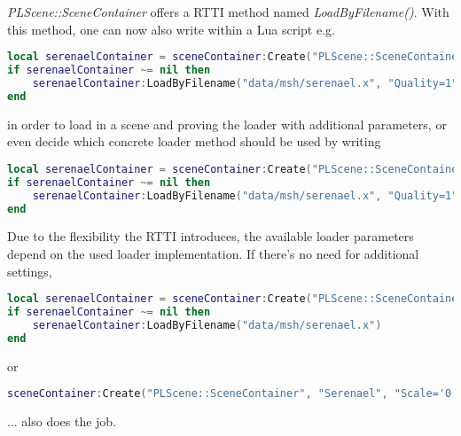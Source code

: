 \emph{PLScene::SceneContainer} offers a RTTI method named \emph{LoadByFilename()}. With this method, one can now also write within a Lua script e.g.
\begin{lstlisting}[language=lua]
local serenaelContainer = sceneContainer:Create("PLScene::SceneContainer", "Serenael", "Scale='0.05 0.05 0.05'")
if serenaelContainer ~= nil then
	serenaelContainer:LoadByFilename("data/msh/serenael.x", "Quality=1")
end
\end{lstlisting}
in order to load in a scene and proving the loader with additional parameters, or even decide which concrete loader method should be used by writing
\begin{lstlisting}[language=lua]
local serenaelContainer = sceneContainer:Create("PLScene::SceneContainer", "Serenael", "Scale='0.05 0.05 0.05'")
if serenaelContainer ~= nil then
	serenaelContainer:LoadByFilename("data/msh/serenael.x", "Quality=1", "LoadParams")
end
\end{lstlisting}
Due to the flexibility the \ac{RTTI} introduces, the available loader parameters depend on the used loader implementation. If there's no need for additional settings,
\begin{lstlisting}[language=lua]
local serenaelContainer = sceneContainer:Create("PLScene::SceneContainer", "Serenael", "Scale='0.05 0.05 0.05'")
if serenaelContainer ~= nil then
	serenaelContainer:LoadByFilename("data/msh/serenael.x")
end
\end{lstlisting}
or
\begin{lstlisting}[language=lua]
sceneContainer:Create("PLScene::SceneContainer", "Serenael", "Scale='0.05 0.05 0.05' Filename='data/msh/serenael.x'")
\end{lstlisting}
...  also does the job.
